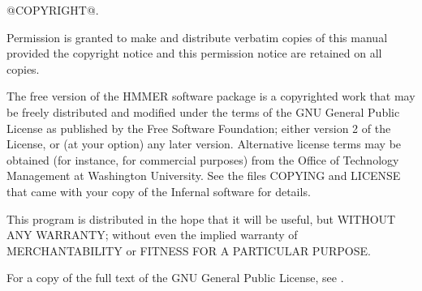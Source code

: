 \vspace*{\fill}
\begin{flushleft}
@COPYRIGHT@.\vspace{5mm}

Permission is granted to make and distribute verbatim copies of this
manual provided the copyright notice and this permission notice are
retained on all copies.\vspace{5mm}

The free version of the HMMER software package is a copyrighted work
that may be freely distributed and modified under the terms of the GNU
General Public License as published by the Free Software Foundation;
either version 2 of the License, or (at your option) any later
version. Alternative license terms may be obtained (for instance, for
commercial purposes) from the Office of Technology Management at
Washington University. See the files COPYING and LICENSE that came
with your copy of the Infernal software for details.\vspace{5mm}

This program is distributed in the hope that it will be useful, but
WITHOUT ANY WARRANTY; without even the implied warranty of
MERCHANTABILITY or FITNESS FOR A PARTICULAR PURPOSE.\vspace{5mm}

For a copy of the full text of the GNU General Public License, see
.
\vspace{5mm}
\end{flushleft}
